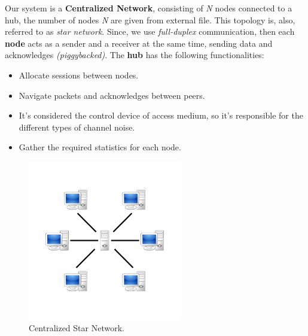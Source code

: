 Our system is a \textbf{Centralized Network}, consisting of \emph{N} nodes connected to a hub,
the number of nodes \emph{N} are given from external file. This topology is, also, referred to as \emph{star network}. Since, we use \emph{full-duplex} communication, then each \textbf{node} acts as a sender and a receiver at the same time, sending data and acknowledges \emph{(piggybacked)}.
\newline
\newline
The \textbf{hub} has the following functionalities:
\begin{itemize}
    \item Allocate sessions between nodes.
    \item Navigate packets and acknowledges between peers.
    \item It's considered the control device of access medium, so it's responsible for the different types of channel noise.
    \item Gather the required statistics for each node.
\end{itemize}

\begin{figure}[H]
    \centering
    \includegraphics[width=0.6\textwidth]{images/net.png}
    \caption{Centralized Star Network.}
    \label{fig:consoles}
\end{figure}